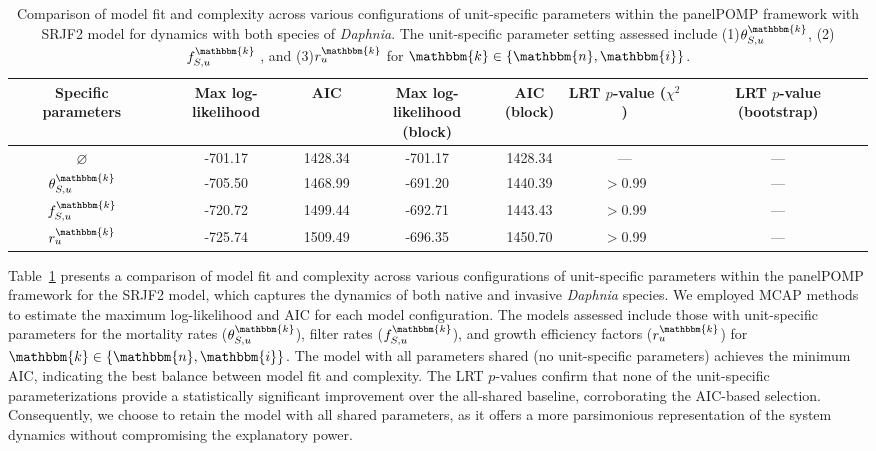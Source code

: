 \documentclass[aoas,preprint]{imsart}\usepackage[]{graphicx}\usepackage[]{xcolor}
\newcommand\unit{u}
\newcommand\species{\mathbbm{k}}
\newcommand\native{\mathbbm{n}}
\newcommand\invasive{\mathbbm{i}}
\begin{document}
\begin{table}[h!]
\centering
\begin{center}
\begin{tabular}{||c |c |c |c|c|c|c||}
 \hline
Specific parameters  & Max log-likelihood & AIC & \makecell[c]{Max log-likelihood\\(block)} & \makecell[c]{AIC\\(block)} & \makecell[c]{LRT\\$p$-value\\($\chi^2$)} & \makecell[c]{LRT\\$p$-value\\(bootstrap)}\\ [0.5ex]
 \hline\hline
$\varnothing$  & -701.17& 1428.34& -701.17& 1428.34 & --- & --- \\
$\theta^{\species}_{S,\unit}$ & -705.50& 1468.99& -691.20& 1440.39 & $>$0.99 & --- \\
$f^{\species}_{S,\unit}$ & -720.72& 1499.44& -692.71& 1443.43 & $>$0.99 & --- \\
$r^{\species}_{\unit}$  & -725.74& 1509.49& -696.35& 1450.70 & $>$0.99 & --- \\[1ex]
 \hline
\end{tabular}
\end{center}
\caption{Comparison of model fit and complexity across various configurations of unit-specific parameters within the panelPOMP framework with SRJF2 model for dynamics with both species of \textit{Daphnia}. The unit-specific parameter setting assessed include (1)$\theta^{\species}_{S,\unit}$, (2)$f^{\species}_{S,\unit}$ , and (3)$r^{\species}_{\unit}$ for $\species \in \{\native,\invasive\}$.}
\label{Table:SRJF2_model_comparison}
\end{table}

Table~\ref{Table:SRJF2_model_comparison} presents a comparison of model fit and complexity across various configurations of unit-specific parameters within the panelPOMP framework for the SRJF2 model, which captures the dynamics of both native and invasive \textit{Daphnia} species.
We employed MCAP methods to estimate the maximum log-likelihood and AIC for each model configuration.
The models assessed include those with unit-specific parameters for the mortality rates ($\theta^{\species}_{S,\unit}$), filter rates ($f^{\species}_{S,\unit}$), and growth efficiency factors ($r^{\species}_{\unit}$) for $\species \in \{\native,\invasive\}$.
The model with all parameters shared (no unit-specific parameters) achieves the minimum AIC, indicating the best balance between model fit and complexity.
The LRT $p$-values confirm that none of the unit-specific parameterizations provide a statistically significant improvement over the all-shared baseline, corroborating the AIC-based selection.
Consequently, we choose to retain the model with all shared parameters, as it offers a more parsimonious representation of the system dynamics without compromising the explanatory power.
\end{document}
